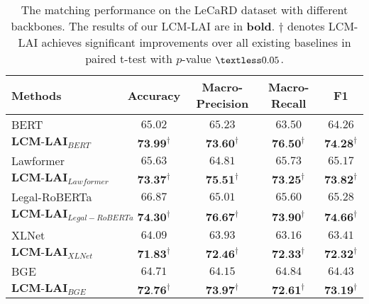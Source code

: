 \begin{table*}[t]
\centering
\small
\caption{
The matching performance on the LeCaRD dataset with different backbones. The results of our LCM-LAI are in \textbf{bold}. $\dagger$ denotes LCM-LAI achieves significant improvements over all existing baselines in paired t-test with $p$-value $\textless 0.05$.
}\label{tab: Different-backbones}
\begin{tabular}{lcccc}
\toprule
Methods   & Accuracy   & Macro-Precision   & Macro-Recall    & F1\\
 \midrule

BERT          
                    & $ 65.02 $     & $ 65.23 $     & $ 63.50 $     & $ 64.26 $     \\

$\textbf{LCM-LAI}_{BERT}$    
                    & $ \textbf{73.99}^{\dagger} $ & $ \textbf{73.60}^{\dagger} $ 
                    & $ \textbf{76.50}^{\dagger} $ & $ \textbf{74.28}^{\dagger} $\\

\midrule
Lawformer          
                    & $ 65.63 $     & $ 64.81 $     & $ 65.73 $     & $ 65.17 $\\
$\textbf{LCM-LAI}_{Lawformer}$    
                    & $ \textbf{73.37}^{\dagger} $ & $ \textbf{75.51}^{\dagger} $ 
                    & $ \textbf{73.25}^{\dagger} $ & $ \textbf{73.82}^{\dagger} $\\
\midrule
Legal-RoBERTa         
                    & $ 66.87 $     & $ 65.01 $  & $ 65.60 $     & $ 65.28 $\\
$\textbf{LCM-LAI}_{Legal-RoBERTa}$   
                    & $ \textbf{74.30}^{\dagger} $ & $ \textbf{76.67}^{\dagger} $ 
                    & $ \textbf{73.90}^{\dagger} $ & $ \textbf{74.66}^{\dagger} $\\
\midrule
XLNet         
                    & $ 64.09 $     & $ 63.93 $   & $ 63.16 $     & $ 63.41 $\\
$\textbf{LCM-LAI}_{XLNet}$   
                    & $ \textbf{71.83}^{\dagger} $ & $ \textbf{72.46}^{\dagger} $ 
                    & $ \textbf{72.33}^{\dagger} $ & $ \textbf{72.32}^{\dagger} $\\

\midrule
BGE         
                    & $ 64.71 $     & $ 64.15 $   & $ 64.84 $     & $ 64.43 $\\
$\textbf{LCM-LAI}_{BGE}$   
                    & $ \textbf{72.76}^{\dagger} $ & $ \textbf{73.97}^{\dagger} $ 
                    & $ \textbf{72.61}^{\dagger} $ & $ \textbf{73.19}^{\dagger} $\\
\bottomrule
\end{tabular}%
\end{table*}

